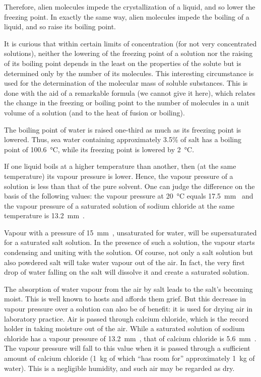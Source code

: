 Therefore, alien molecules impede the crystallization of a liquid, and so lower the freezing point. In exactly the same way, alien molecules impede the boiling of a liquid, and so raise its boiling point.

It is curious that within certain limits of concentration (for not very concentrated solutions), neither the lowering of the freezing point of a solution nor the raising of its boiling point depends in the least on the properties of the solute but is determined only by the number of its molecules. This interesting circumstance is used for the determination of the molecular mass of soluble substances. This is done with the aid of a remarkable formula (we cannot give it here), which relates the change in the freez­ing or boiling point to the number of molecules in a unit volume of a solution (and to the heat of fusion or boiling).

The boiling point of water is raised one-third as much as its freezing point is lowered. Thus, sea water containing approximately 3.5\% of salt has a boiling point of \SI{100.6}{\celsius}, while its freezing point is lowered by \SI{2}{\celsius}.

If one liquid boils at a higher temperature than another, then (at the same temperature) its vapour pressure is lower. Hence, the vapour pressure of a solution is less than that of the pure solvent. One can judge the differ­ence on the basis of the following values: the vapour pres­sure at \SI{20}{\celsius} equals \SI{17.5}{\milli\meter\mercury} and the vapour pressure of a saturated solution of sodium chloride at the same temperature is \SI{13.2}{\milli\meter\mercury}.

Vapour with a pressure of \SI{15}{\milli\meter\mercury}, unsaturated for water, will be supersaturated for a saturated salt solu­tion. In the presence of such a solution, the vapour starts condensing and uniting with the solution. Of course, not only a salt solution but also powdered salt will take wa­ter vapour out of the air. In fact, the very first drop of water falling on the salt will dissolve it and create a saturated solution.

The absorption of water vapour from the air by salt leads to the salt’s becoming moist. This is well known to hosts and affords them grief. But this decrease in vapour pressure over a solution can also be of benefit: it is used for drying air in laboratory practice. Air is passed through calcium chloride, which is the record holder in taking moisture out of the air. While a saturated solution of sodium chloride has a vapour pressure of \SI{13.2}{\milli\meter\mercury}, that of calcium chloride is \SI{5.6}{\milli\meter\mercury}. The vapour pres­sure will fall to this value when it is passed through a sufficient amount of calcium chloride (\SI{1}{\kilo\gram} of which “has room for” approximately \SI{1}{\kilo\gram} of water). This is a negligible humidity, and such air may be regarded as dry.

